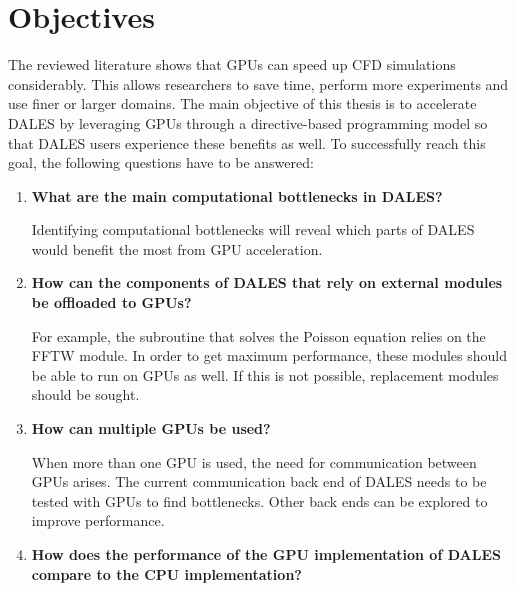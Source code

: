 \section{Objectives}
The reviewed literature shows that GPUs can speed up CFD simulations considerably. This allows researchers to save time, perform more experiments and use finer or larger domains. The main objective of this thesis is to accelerate DALES by leveraging GPUs through a directive-based programming model so that DALES users experience these benefits as well. To successfully reach this goal, the following questions have to be answered:

\begin{enumerate}
    \item \textbf{What are the main computational bottlenecks in DALES?}
    
    Identifying computational bottlenecks will reveal which parts of DALES would benefit the most from GPU acceleration. 
    
    \item \textbf{How can the components of DALES that rely on external modules be offloaded to GPUs?}
    
    For example, the subroutine that solves the Poisson equation relies on the FFTW module. In order to get maximum performance, these modules should be able to run on GPUs as well. If this is not possible, replacement modules should be sought.
    
    \item \textbf{How can multiple GPUs be used?}

    When more than one GPU is used, the need for communication between GPUs arises. The current communication back end of DALES needs to be tested with GPUs to find bottlenecks. Other back ends can be explored to improve performance. 
    
    \item \textbf{How does the performance of the GPU implementation of DALES compare to the CPU  implementation?}

    
    
    
\end{enumerate}